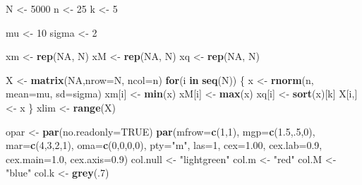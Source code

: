 \documentclass[]{book}
\newenvironment{Shaded}{\begin{snugshade}}{\end{snugshade}}
\newcommand{\ControlFlowTok}[1]{\textcolor[rgb]{0.13,0.29,0.53}{\textbf{#1}}}
\newcommand{\DataTypeTok}[1]{\textcolor[rgb]{0.13,0.29,0.53}{#1}}
\newcommand{\DecValTok}[1]{\textcolor[rgb]{0.00,0.00,0.81}{#1}}
\newcommand{\FloatTok}[1]{\textcolor[rgb]{0.00,0.00,0.81}{#1}}
\newcommand{\KeywordTok}[1]{\textcolor[rgb]{0.13,0.29,0.53}{\textbf{#1}}}
\newcommand{\NormalTok}[1]{#1}
\newcommand{\OtherTok}[1]{\textcolor[rgb]{0.56,0.35,0.01}{#1}}
\newcommand{\StringTok}[1]{\textcolor[rgb]{0.31,0.60,0.02}{#1}}
\begin{document}
\begin{Shaded}
\begin{Highlighting}[]
\NormalTok{N <-}\StringTok{ }\DecValTok{5000}
\NormalTok{n <-}\StringTok{ }\DecValTok{25}
\NormalTok{k <-}\StringTok{ }\DecValTok{5}

\NormalTok{mu <-}\StringTok{ }\DecValTok{10}
\NormalTok{sigma <-}\StringTok{ }\DecValTok{2}

\NormalTok{xm <-}\StringTok{ }\KeywordTok{rep}\NormalTok{(}\OtherTok{NA}\NormalTok{, N)}
\NormalTok{xM <-}\StringTok{ }\KeywordTok{rep}\NormalTok{(}\OtherTok{NA}\NormalTok{, N)}
\NormalTok{xq <-}\StringTok{ }\KeywordTok{rep}\NormalTok{(}\OtherTok{NA}\NormalTok{, N)}

\NormalTok{X <-}\StringTok{ }\KeywordTok{matrix}\NormalTok{(}\OtherTok{NA}\NormalTok{,}\DataTypeTok{nrow=}\NormalTok{N, }\DataTypeTok{ncol=}\NormalTok{n)}
\ControlFlowTok{for}\NormalTok{(i }\ControlFlowTok{in} \KeywordTok{seq}\NormalTok{(N)) \{}
\NormalTok{  x <-}\StringTok{ }\KeywordTok{rnorm}\NormalTok{(n, }\DataTypeTok{mean=}\NormalTok{mu, }\DataTypeTok{sd=}\NormalTok{sigma)}
\NormalTok{  xm[i] <-}\StringTok{ }\KeywordTok{min}\NormalTok{(x)}
\NormalTok{  xM[i] <-}\StringTok{ }\KeywordTok{max}\NormalTok{(x)}
\NormalTok{  xq[i] <-}\StringTok{ }\KeywordTok{sort}\NormalTok{(x)[k]}
\NormalTok{  X[i,] <-}\StringTok{ }\NormalTok{x}
\NormalTok{\}}
\NormalTok{xlim <-}\StringTok{ }\KeywordTok{range}\NormalTok{(X)}

\NormalTok{opar <-}\StringTok{ }\KeywordTok{par}\NormalTok{(}\DataTypeTok{no.readonly=}\OtherTok{TRUE}\NormalTok{)}
\KeywordTok{par}\NormalTok{(}\DataTypeTok{mfrow=}\KeywordTok{c}\NormalTok{(}\DecValTok{1}\NormalTok{,}\DecValTok{1}\NormalTok{), }\DataTypeTok{mgp=}\KeywordTok{c}\NormalTok{(}\FloatTok{1.5}\NormalTok{,.}\DecValTok{5}\NormalTok{,}\DecValTok{0}\NormalTok{), }\DataTypeTok{mar=}\KeywordTok{c}\NormalTok{(}\DecValTok{4}\NormalTok{,}\DecValTok{3}\NormalTok{,}\DecValTok{2}\NormalTok{,}\DecValTok{1}\NormalTok{), }\DataTypeTok{oma=}\KeywordTok{c}\NormalTok{(}\DecValTok{0}\NormalTok{,}\DecValTok{0}\NormalTok{,}\DecValTok{0}\NormalTok{,}\DecValTok{0}\NormalTok{), }\DataTypeTok{pty=}\StringTok{"m"}\NormalTok{, }\DataTypeTok{las=}\DecValTok{1}\NormalTok{, }
    \DataTypeTok{cex=}\FloatTok{1.00}\NormalTok{, }\DataTypeTok{cex.lab=}\FloatTok{0.9}\NormalTok{, }\DataTypeTok{cex.main=}\FloatTok{1.0}\NormalTok{, }\DataTypeTok{cex.axis=}\FloatTok{0.9}\NormalTok{)}
\NormalTok{col.null <-}\StringTok{ "lightgreen"}
\NormalTok{col.m <-}\StringTok{ "red"}
\NormalTok{col.M <-}\StringTok{ "blue"}
\NormalTok{col.k <-}\StringTok{ }\KeywordTok{grey}\NormalTok{(.}\DecValTok{7}\NormalTok{)}


\end{Highlighting}
\end{Shaded}
\end{document}
